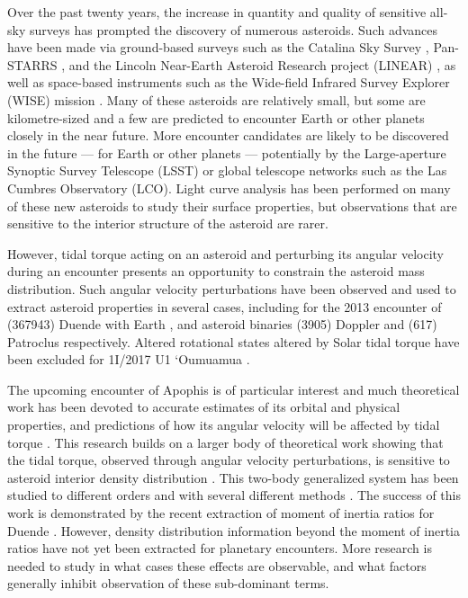 \documentclass[fleqn,usenatbib]{mnras}
\begin{document}
Over the past twenty years, the increase in quantity and quality of sensitive all-sky surveys has prompted the discovery of numerous asteroids. Such advances have been made via ground-based surveys such as the Catalina Sky Survey \cite{larson1998catalina}, Pan-STARRS \cite{kaiser2002pan}, and the Lincoln Near-Earth Asteroid Research project (LINEAR) \cite{stokes2000lincoln}, as well as space-based instruments such as the Wide-field Infrared Survey Explorer (WISE) mission \cite{wright2010wide}. Many of these asteroids are relatively small, but some are kilometre-sized and a few are predicted to encounter Earth or other planets closely in the near future. More encounter candidates are likely to be discovered in the future --- for Earth or other planets --- potentially by the Large-aperture Synoptic Survey Telescope (LSST) or global telescope networks such as the Las Cumbres Observatory (LCO). Light curve analysis has been performed on many of these new asteroids to study their surface properties, but observations that are sensitive to the interior structure of the asteroid are rarer.

However, tidal torque acting on an asteroid and perturbing its angular velocity during an encounter presents an opportunity to constrain the asteroid mass distribution. Such angular velocity perturbations have been observed and used to extract asteroid properties in several cases, including for the 2013 encounter of (367943) Duende with Earth \cite{MOSKOVITZ2020113519, benson2020spin}, and asteroid binaries (3905) Doppler and (617) Patroclus respectively. Altered rotational states altered by Solar tidal torque have been excluded for 1I/2017 U1 `Oumuamua \cite{KWIECINSKI2018170}.

The upcoming encounter of Apophis is of particular interest and much theoretical work has been devoted to accurate estimates of its orbital and physical properties, and predictions of how its angular velocity will be affected by tidal torque \cite{yu2014numerical, hirabayashi2021finite,valvano2022apophis, Lee2022Apophis, souchay2014rotational, souchay2018changes}. This research builds on a larger body of theoretical work showing that the tidal torque, observed through angular velocity perturbations, is sensitive to asteroid interior density distribution \cite{Naidu_2015, Makarov2022ChaosOO, RICHARDSON199847, scheeres2004evolution}. This two-body generalized system has been studied to different orders and with several different methods \cite{paul88, SCHEERES2000106, ashenberg07, BOUE2009750, HouMar2017}. The success of this work is demonstrated by the recent extraction of moment of inertia ratios for Duende \cite{MOSKOVITZ2020113519}. However, density distribution information beyond the moment of inertia ratios have not yet been extracted for planetary encounters. More research is needed to study in what cases these effects are observable, and what factors generally inhibit observation of these sub-dominant terms. 
\end{document}
